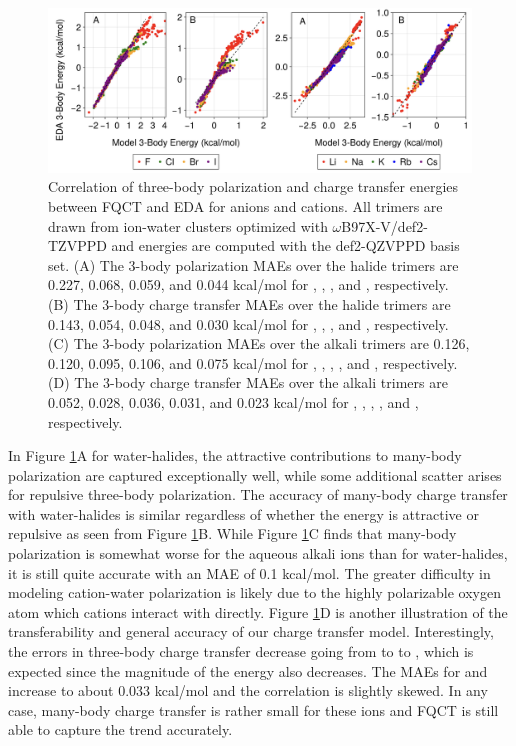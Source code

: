 \documentclass[journal=jctcce,manuscript=article]{achemso}
\begin{document}
\begin{figure}[h]
  \includegraphics*[width=\textwidth]{figures/three_body_pol_and_ct_ions.png}
  \caption{Correlation of three-body polarization and charge transfer energies between FQCT and EDA for anions and cations. All trimers are drawn from ion-water clusters optimized with $\omega$B97X-V/def2-TZVPPD and energies are computed with the def2-QZVPPD basis set. (A) The 3-body polarization MAEs over the halide trimers are 0.227, 0.068, 0.059, and 0.044 kcal/mol
  for , , , and , respectively. (B) The 3-body charge transfer MAEs over
  the halide trimers are 0.143, 0.054, 0.048, and 0.030 kcal/mol
  for , , , and , respectively. (C) The 3-body polarization MAEs over the alkali trimers are 0.126, 0.120, 0.095, 0.106, and 0.075 kcal/mol for , , , , and ,
  respectively. (D) The 3-body charge transfer MAEs over the alkali trimers are
  0.052, 0.028, 0.036, 0.031, and 0.023 kcal/mol for , , , , and ,
  respectively.
}
  \label{fig:Pol_CT_ions}
\end{figure}

In Figure \ref{fig:Pol_CT_ions}A for water-halides, the attractive contributions to many-body polarization are captured exceptionally well, while some additional scatter arises for repulsive three-body polarization. The accuracy of many-body charge transfer with water-halides is similar regardless of whether the energy is attractive or repulsive as seen from Figure \ref{fig:Pol_CT_ions}B. While Figure \ref{fig:Pol_CT_ions}C finds that many-body polarization is somewhat worse for the aqueous alkali ions than for water-halides, it is still quite accurate with an MAE of 0.1 kcal/mol. The greater difficulty in modeling cation-water polarization is likely due to the highly polarizable oxygen atom which cations interact with directly. Figure \ref{fig:Pol_CT_ions}D is another illustration of the transferability and general accuracy of our charge transfer model. Interestingly, the errors in three-body charge transfer decrease going from  to  to , which is expected since the magnitude of the energy also decreases. The MAEs for  and  increase to about 0.033 kcal/mol and the correlation is slightly skewed. In any case, many-body charge transfer is rather small for these ions and FQCT is still able to capture the trend accurately.
\end{document}
